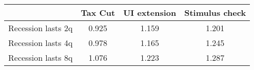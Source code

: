 \begin{tabular}{@{}lccc@{}} 
\toprule 
& Tax Cut    & UI extension    & Stimulus check    \\  \midrule 
Recession lasts 2q &0.925  & 1.159  & 1.201     \\ 
Recession lasts 4q &0.978  & 1.165  & 1.245     \\ 
Recession lasts 8q &1.076  & 1.223  & 1.287     \\ 
\end{tabular}  
